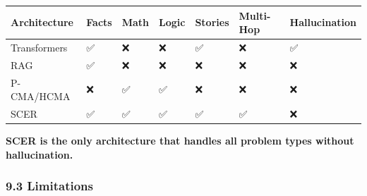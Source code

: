 \documentclass[
  11pt,
  a4paper,
]{article}
\begin{document}
\begin{longtable}[]{@{}
  >{\raggedright\arraybackslash}p{}
  >{\raggedright\arraybackslash}p{}
  >{\raggedright\arraybackslash}p{}
  >{\raggedright\arraybackslash}p{}
  >{\raggedright\arraybackslash}p{}
  >{\raggedright\arraybackslash}p{}
  >{\raggedright\arraybackslash}p{}@{}}
\toprule\noalign{}
\begin{minipage}[b]{\linewidth}\raggedright
Architecture
\end{minipage} & \begin{minipage}[b]{\linewidth}\raggedright
Facts
\end{minipage} & \begin{minipage}[b]{\linewidth}\raggedright
Math
\end{minipage} & \begin{minipage}[b]{\linewidth}\raggedright
Logic
\end{minipage} & \begin{minipage}[b]{\linewidth}\raggedright
Stories
\end{minipage} & \begin{minipage}[b]{\linewidth}\raggedright
Multi-Hop
\end{minipage} & \begin{minipage}[b]{\linewidth}\raggedright
Hallucination
\end{minipage} \\
\midrule\noalign{}
\endhead
\bottomrule\noalign{}
\endlastfoot
Transformers & ✅ & ❌ & ❌ & ✅ & ❌ & ✅ \\
RAG & ✅ & ❌ & ❌ & ❌ & ❌ & ❌ \\
P-CMA/HCMA & ❌ & ✅ & ✅ & ❌ & ❌ & ❌ \\
SCER & ✅ & ✅ & ✅ & ✅ & ✅ & ❌ \\
\end{longtable}

\textbf{SCER is the only architecture that handles all problem types
without hallucination.}

\subsubsection{9.3 Limitations}\label{limitations}
\end{document}
